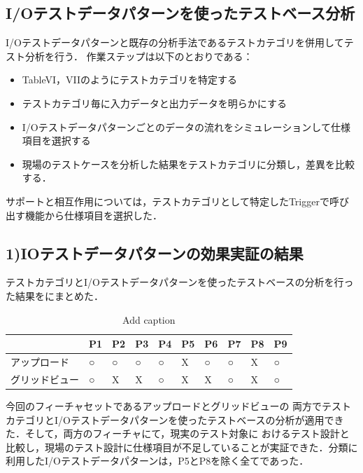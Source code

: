 \subsection{I/Oテストデータパターンを使ったテストベース分析}
I/Oテストデータパターンと既存の分析手法であるテストカテゴリを併用してテスト分析を行う．
作業ステップは以下のとおりである：
\begin{itemize}
 \item TableVI，VIIのようにテストカテゴリを特定する
 \item テストカテゴリ毎に入力データと出力データを明らかにする
 \item I/Oテストデータパターンごとのデータの流れをシミュレーションして仕様項目を選択する
　\item 現場のテストケースを分析した結果をテストカテゴリに分類し，差異を比較する．
\end{itemize}
サポートと相互作用については，テストカテゴリとして特定したTriggerで呼び出す機能から仕様項目を選択した．

\subsection{1)IOテストデータパターンの効果実証の結果}
テストカテゴリとI/Oテストデータパターンを使ったテストベースの分析を行った結果をにまとめた．

\begin{table}[htbp]
  \centering
  \caption{Add caption}
    \begin{tabular}{|p{4em}|p{4em}|p{4em}|p{4em}|p{4em}|p{2em}|p{1.915em}|p{4em}|p{4em}|p{4em}|}
    \hline
    \multicolumn{1}{|r|}{} & \multicolumn{1}{l|}{P1} & \multicolumn{1}{l|}{P2} & \multicolumn{1}{l|}{P3} & \multicolumn{1}{l|}{P4} & \multicolumn{1}{l|}{P5} & \multicolumn{1}{l|}{P6} & \multicolumn{1}{l|}{P7} & \multicolumn{1}{l|}{P8} & \multicolumn{1}{l|}{P9} \bigstrut\\
    \hline
    アップロード & ○     & ○     & ○     & ○     & X     & ○     & ○     & X     & ○ \bigstrut\\
    \hline
    グリッドビュー & ○     & X     & X     & ○     & X     & X     & ○     & X     & ○ \bigstrut\\
    \hline
    \end{tabular}%
  \label{tab:addlabel}%
\end{table}%


今回のフィーチャセットであるアップロードとグリッドビューの 両方でテストカテゴリとI/Oテストデータパターンを使ったテストベースの分析が適用できた．そして，両方のフィーチャにて，現実のテスト対象に おけるテスト設計と比較し，現場のテスト設計に仕様項目が不足していることが実証できた．分類に利用したI/Oテストデータパターンは，P5とP8を除く全てであった．


